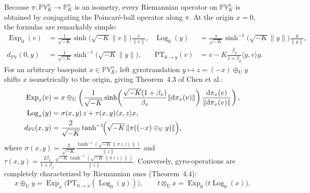 Because \(\pi:\mathbb{PV}_K^n\to\mathbb{P}_K^n\) is an isometry, every Riemannian operator on \(\mathbb{PV}_K^n\) is obtained by conjugating the Poincar\'e-ball operator along \(\pi\). At the origin \(x=0\), the formulas are remarkably simple:
\begin{align}
  \operatorname{Exp}_0(v) &= \frac{1}{\sqrt{-K}}\sinh\!\bigl(\sqrt{-K}\|v\|\bigr)\frac{v}{\|v\|}, &
  \operatorname{Log}_0(y) &= \frac{1}{\sqrt{-K}}\sinh^{-1}\!\bigl(\sqrt{-K}\|y\|\bigr)\frac{y}{\|y\|}, \label{eq:N20261121-origin-explog} \\
  d_{\mathbb{PV}}(0,y) &= \frac{1}{\sqrt{-K}}\sinh^{-1}\!\bigl(\sqrt{-K}\|y\|\bigr), &
  \mathrm{PT}_{0\to y}(v) &= v - K\frac{\beta_y}{1+\beta_y}\langle y,v\rangle y. \label{eq:N20261121-origin-pt}
\end{align}
For an arbitrary basepoint \(x\in\mathbb{PV}_K^n\), left gyrotranslation \(y\mapsto z=(-x)\oplus_{\mathrm{U}} y\) shifts \(x\) isometrically to the origin, giving Theorem~4.3 of Chen et al.:
\begin{align}
  \operatorname{Exp}_x(v) &= x \oplus_{\mathrm{U}} \left(\frac{1}{\sqrt{-K}}\sinh\!\left(\frac{\sqrt{-K}(1+\beta_x)}{\beta_x}\|\mathrm{d}\pi_x(v)\|\right)\frac{\mathrm{d}\pi_x(v)}{\|\mathrm{d}\pi_x(v)\|}\right), \label{eq:N20261121-exp} \\
  \operatorname{Log}_x(y) &= \sigma(x,y)\,z + \tau(x,y)\langle x,z\rangle x, \label{eq:N20261121-log} \\
  d_{\mathbb{PV}}(x,y) &= \frac{2}{\sqrt{-K}}\tanh^{-1}\!\Bigl(\sqrt{-K}\,\|\pi((-x)\oplus_{\mathrm{U}} y)\|\Bigr), \label{eq:N20261121-dist}
\end{align}
where \(\sigma(x,y) = \frac{2}{\sqrt{-K}}\frac{\tanh^{-1}(\sqrt{-K}\|\pi(z)\|)}{\|z\|}\) and \(\tau(x,y) = \frac{2\beta_x}{1+\beta_x}\frac{\sqrt{-K}\tanh^{-1}(\sqrt{-K}\|\pi(z)\|)}{\|z\|}\). Conversely, gyro-operations are completely characterized by Riemannian ones (Theorem~4.4):
\[
  x\oplus_{\mathrm{U}} y = \operatorname{Exp}_x\!\bigl(\mathrm{PT}_{0\to x}(\operatorname{Log}_0(y))\bigr),
  \qquad
  t\otimes_{\mathrm{U}} x = \operatorname{Exp}_0\!\bigl(t\operatorname{Log}_0(x)\bigr).
\]


